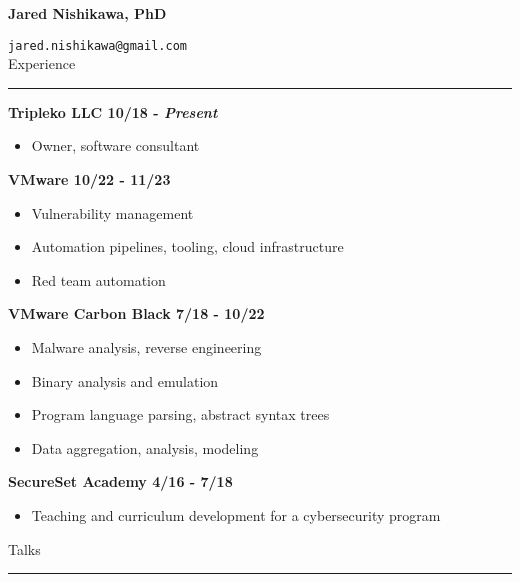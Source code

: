 \documentclass{letter}
\begin{document}
\newcommand{\vspc}{\vskip5mm}


\textbf{\Huge{Jared Nishikawa, PhD}}

\texttt{jared.nishikawa@gmail.com} \\


\large{Experience}
\hrule

\textbf{Tripleko LLC \hfill 10/18 - \textit{Present}}
\begin{itemize}
    \setlength\itemsep{-0.5em}
    \item Owner, software consultant
\end{itemize}
\textbf{VMware \hfill 10/22 - 11/23}
\begin{itemize}
    \setlength\itemsep{-0.5em}
    \item Vulnerability management
    \item Automation pipelines, tooling, cloud infrastructure
    \item Red team automation
\end{itemize}

\textbf{VMware Carbon Black \hfill 7/18 - 10/22}
\begin{itemize}
    \setlength\itemsep{-0.5em}
    \item Malware analysis, reverse engineering
    \item Binary analysis and emulation
    \item Program language parsing, abstract syntax trees
    \item Data aggregation, analysis, modeling
\end{itemize}

\textbf{SecureSet Academy \hfill 4/16 - 7/18}
\begin{itemize}
    \setlength\itemsep{-0.5em}
    \item Teaching and curriculum development for a cybersecurity program
\end{itemize}

\vspc



\large{Talks}
\vskip1mm
\hrule
\end{document}
